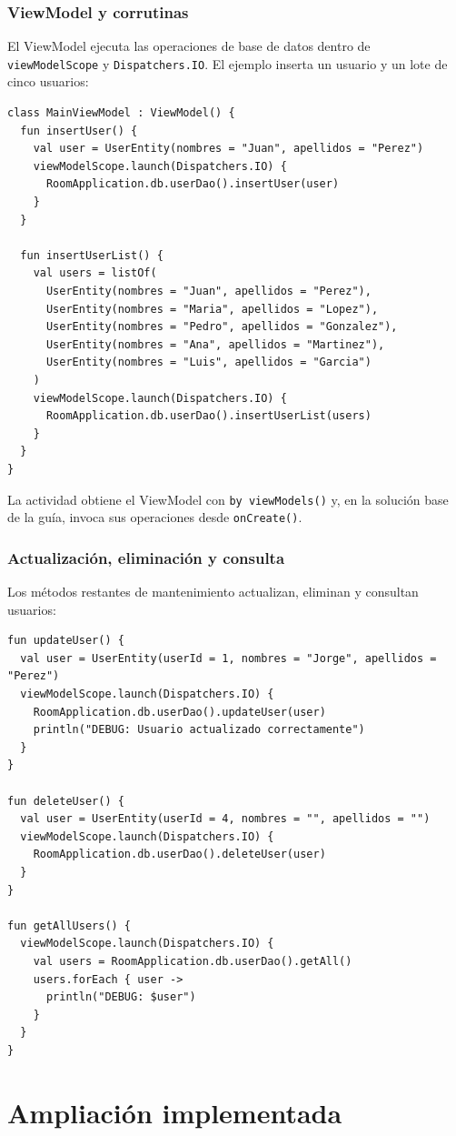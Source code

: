 \documentclass[12pt,a4paper,oneside]{report}
\begin{document}
\subsection{ViewModel y corrutinas}
El ViewModel ejecuta las operaciones de base de datos dentro de
\texttt{viewModelScope} y \texttt{Dispatchers.IO}. El ejemplo inserta un usuario y
un lote de cinco usuarios:
\begin{lstlisting}
class MainViewModel : ViewModel() {
  fun insertUser() {
    val user = UserEntity(nombres = "Juan", apellidos = "Perez")
    viewModelScope.launch(Dispatchers.IO) {
      RoomApplication.db.userDao().insertUser(user)
    }
  }

  fun insertUserList() {
    val users = listOf(
      UserEntity(nombres = "Juan", apellidos = "Perez"),
      UserEntity(nombres = "Maria", apellidos = "Lopez"),
      UserEntity(nombres = "Pedro", apellidos = "Gonzalez"),
      UserEntity(nombres = "Ana", apellidos = "Martinez"),
      UserEntity(nombres = "Luis", apellidos = "Garcia")
    )
    viewModelScope.launch(Dispatchers.IO) {
      RoomApplication.db.userDao().insertUserList(users)
    }
  }
}
\end{lstlisting}

La actividad obtiene el ViewModel con \texttt{by viewModels()} y, en la solución
base de la guía, invoca sus operaciones desde \texttt{onCreate()}.

\subsection{Actualización, eliminación y consulta}
Los métodos restantes de mantenimiento actualizan, eliminan y consultan usuarios:
\begin{lstlisting}
fun updateUser() {
  val user = UserEntity(userId = 1, nombres = "Jorge", apellidos = "Perez")
  viewModelScope.launch(Dispatchers.IO) {
    RoomApplication.db.userDao().updateUser(user)
    println("DEBUG: Usuario actualizado correctamente")
  }
}

fun deleteUser() {
  val user = UserEntity(userId = 4, nombres = "", apellidos = "")
  viewModelScope.launch(Dispatchers.IO) {
    RoomApplication.db.userDao().deleteUser(user)
  }
}

fun getAllUsers() {
  viewModelScope.launch(Dispatchers.IO) {
    val users = RoomApplication.db.userDao().getAll()
    users.forEach { user ->
      println("DEBUG: $user")
    }
  }
}
\end{lstlisting}

\chapter{Ampliación implementada}
\end{document}

